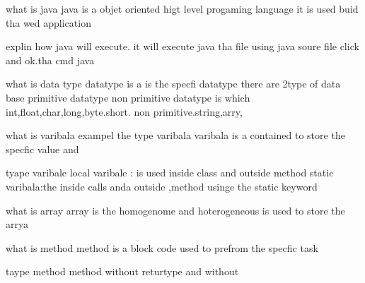 what is java
java is a objet oriented higt level progaming language it is used buid tha wed application

explin how java will execute.
it will execute java tha file using java soure file click and ok.tha cmd java
 
what is data type
datatype is a is the specfi datatype
there are 2type of data base
primitive datatype non primitive datatype is which int,float,char,long,byte.short.
non primitive.string,arry,

what is varibala exampel the type varibala
varibala is a contained to store the specfic value and

tyape varibale
local varibale :  is used inside class and outside method
static varibala:the inside calls anda outside ,method usinge the static keyword

what is array
array is the homogenome and hoterogeneous is used to store the arrya

what is method
method is a block code used to prefrom the specfic task

 taype method
 method without returtype and without 
